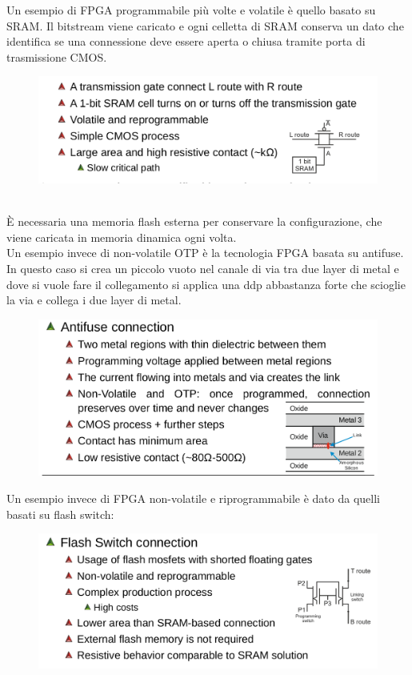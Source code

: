 \documentclass{book}
\begin{document}
    Un esempio di FPGA programmabile più volte e volatile è quello basato su SRAM. Il bitstream viene caricato e ogni celletta di SRAM conserva un dato che identifica se una connessione deve essere aperta o chiusa tramite porta di trasmissione CMOS.
    \begin{figure}[h!]
        \centering
        \includegraphics[width=0.75\linewidth]{img/chapt4img3.png}
    \end{figure}\\
    È necessaria una memoria flash esterna per conservare la configurazione, che viene caricata in memoria dinamica ogni volta.\\
    Un esempio invece di non-volatile OTP è la tecnologia FPGA basata su antifuse. In questo caso si crea un piccolo vuoto nel canale di via tra due layer di metal e dove si vuole fare il collegamento si applica una ddp abbastanza forte che scioglie la via e collega i due layer di metal.
    \newpage
    \begin{figure}[h!]
        \centering
        \includegraphics[width=0.75\linewidth]{img/chapt4img4.png}
    \end{figure}
    Un esempio invece di FPGA non-volatile e riprogrammabile è dato da quelli basati su flash switch:
    \begin{figure}[h!]
        \centering
        \includegraphics[width=0.75\linewidth]{img/chapt4img5.png}
    \end{figure}
\end{document}
